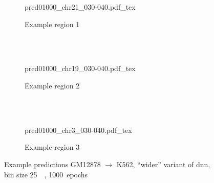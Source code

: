 \begin{figure}[p]
    \begin{subfigure}{\textwidth}
        \centering
        \scriptsize
        {pred01000_chr21_030-040.pdf_tex}
        \caption{Example  region 1} \label{fig:results:wider_r1}
    \end{subfigure}\\[2mm]
    \\[3mm]
    \begin{subfigure}{\textwidth}
        \centering
        \scriptsize
        {pred01000_chr19_030-040.pdf_tex}
        \caption{Example region 2} \label{fig:results:wider_r2}
    \end{subfigure}\\[2mm]
    \\[3mm]
    \begin{subfigure}{\textwidth}
        \centering
        \scriptsize
        {pred01000_chr3_030-040.pdf_tex}
        \caption{Example region 3} \label{fig:results:wider_r3}
    \end{subfigure}
    \caption{Example predictions GM12878 $\rightarrow$ K562, ``wider'' variant of \acrshort{dnn},\\bin size \SI{25}{\kilo\bp}, 1000~epochs}\label{fig:results:wider_matrices}
\end{figure}
